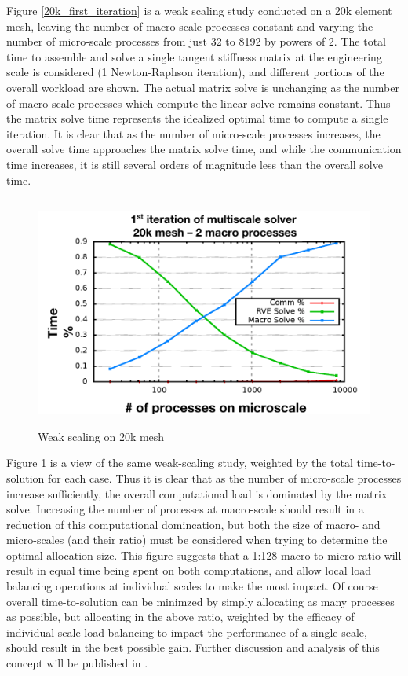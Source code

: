 Figure \ref{20k_first_iteration} is a weak scaling study conducted on a 20k element mesh, leaving the number of macro-scale processes constant and varying the number of micro-scale processes from just 32 to 8192 by powers of 2. The total time to assemble and solve a single tangent stiffness matrix at the engineering scale is considered (1 Newton-Raphson iteration), and different portions of the overall workload are shown. The actual matrix solve is unchanging as the number of macro-scale processes which compute the linear solve remains constant. Thus the matrix solve time represents the idealized optimal time to compute a single iteration. It is clear that as the number of micro-scale processes increases, the overall solve time approaches the matrix solve time, and while the communication time increases, it is still several orders of magnitude less than the overall solve time.

\begin{figure}
  \begin{center}
    \includegraphics[height=3in]{siam_pp_weak_scaling.png}
  \end{center}
  \caption{\small Weak scaling on 20k mesh}
  \label{weak_scaling}
\end{figure}

Figure \ref{weak_scaling} is a view of the same weak-scaling study, weighted by the total time-to-solution for each case. Thus it is clear that as the number of micro-scale processes increase sufficiently, the overall computational load is dominated by the matrix solve. Increasing the number of processes at macro-scale should result in a reduction of this computational domincation, but both the size of macro- and micro-scales (and their ratio) must be considered when trying to determine the optimal allocation size. This figure suggests that a 1:128 macro-to-micro ratio will result in equal time being spent on both computations, and allow local load balancing operations at individual scales to make the most impact. Of course overall time-to-solution can be minimzed by simply allocating as many processes as possible, but allocating in the above ratio, weighted by the efficacy of individual scale load-balancing to impact the performance of a single scale, should result in the best possible gain. Further discussion and analysis of this concept will be published in \cite{wtobin2015mlb}.

